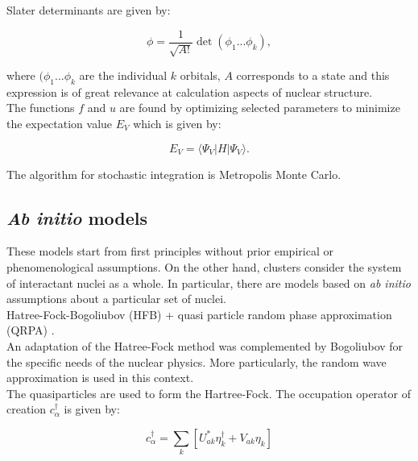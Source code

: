 \documentclass[openany]{book}
\begin{document}
Slater determinants are given by: 

\begin{equation} \label{eq:micro_slatter}
	\phi = \frac{1}{\sqrt{A!}} \det{(\phi_1 ... \phi_k)},
\end{equation}

where $(\phi_1 ... \phi_k$ are the individual $k$ orbitals, $A$ corresponds to a state and this expression is of great relevance at calculation aspects of nuclear structure. \\

The functions $f$ and $u$ are found by optimizing selected parameters to minimize the expectation value $E_V$ which is given by:

\begin{equation}\label{eq:micro_modernTheories_expectationValue}
	E_V = \langle \Psi_V | H | \Psi_V \rangle.
\end{equation}

The algorithm for stochastic integration is Metropolis Monte Carlo. \\



\subsection{\textit{Ab initio} models} \label{sub:microscopical_abinitio}

These models start from first principles without prior empirical or phenomenological assumptions. 
On the other hand, clusters consider the system of interactant nuclei as a whole. In particular, there are models based on \textit{ab initio} assumptions about a particular set of nuclei.  \\
 
Hatree-Fock-Bogoliubov (HFB) + quasi particle random phase approximation (QRPA) \cite{chimanski_in_escher_peru_younes_2022}. \\

An adaptation of the Hatree-Fock method was complemented by Bogoliubov for the specific needs of the nuclear physics. More particularly, the random wave approximation is used in this context.  \\

The quasiparticles are used to form the Hartree-Fock. The occupation operator of creation $c^{\dagger}_\alpha$ is given by:

\begin{equation}\label{eq:micro_HFB_creation}
	c^{\dagger}_\alpha = \sum_{k} [U^{*}_{ak} \eta^{\dagger}_k + V_{ak} \eta_k]
\end{equation}
\end{document}
